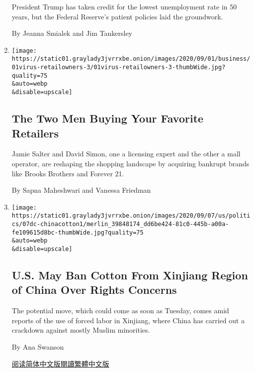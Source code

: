 \begin{enumerate}
  President Trump has taken credit for the lowest unemployment rate in
  50 years, but the Federal Reserve's patient policies laid the
  groundwork.

  By Jeanna Smialek and Jim Tankersley
\item
  \href{/2020/09/08/business/retail-bankruptcy-authentic-brands.html}{}

  \texttt{[image: https://static01.graylady3jvrrxbe.onion/images/2020/09/01/business/01virus-retailowners-3/01virus-retailowners-3-thumbWide.jpg?quality=75\\\&auto=webp\\\&disable=upscale]}

  \hypertarget{the-two-men-buying-your-favorite-retailers}{%
  \subsection{The Two Men Buying Your Favorite
  Retailers}\label{the-two-men-buying-your-favorite-retailers}}

  Jamie Salter and David Simon, one a licensing expert and the other a
  mall operator, are reshaping the shopping landscape by acquiring
  bankrupt brands like Brooks Brothers and Forever 21.

  By Sapna Maheshwari and Vanessa Friedman
\item
  \href{/2020/09/07/business/economy/us-china-xinjiang-cotton-ban.html}{}

  \texttt{[image: https://static01.graylady3jvrrxbe.onion/images/2020/09/07/us/politics/07dc-chinacotton1/merlin\_39848174\_dd6be424-81c0-445b-a00a-fe109615d8bc-thumbWide.jpg?quality=75\\\&auto=webp\\\&disable=upscale]}

  \hypertarget{us-may-ban-cotton-from-xinjiang-region-of-china-over-rights-concerns}{%
  \subsection{U.S. May Ban Cotton From Xinjiang Region of China Over
  Rights
  Concerns}\label{us-may-ban-cotton-from-xinjiang-region-of-china-over-rights-concerns}}

  The potential move, which could come as soon as Tuesday, comes amid
  reports of the use of forced labor in Xinjiang, where China has
  carried out a crackdown against mostly Muslim minorities.

  By Ana Swanson

  \href{https://cn.nytimes3xbfgragh.onion/usa/20200908/us-china-xinjiang-cotton-ban/}{阅读简体中文版}\href{https://cn.nytimes3xbfgragh.onion/usa/20200908/us-china-xinjiang-cotton-ban/zh-hant/}{閱讀繁體中文版}
\end{enumerate}


